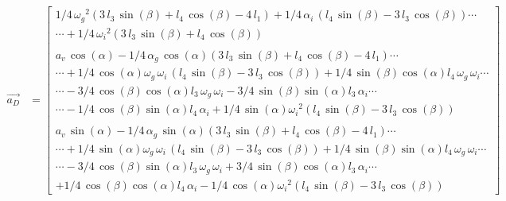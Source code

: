 \begin{equation*}
\begin{split}
\overrightarrow{a_{D}}
&=	\begin{bmatrix}
1/4\,{\omega_{g}}^{2} \left( 3\,l_{3}\,\sin\left( \beta \right) +l_{4}\,\cos \left( \beta \right) -4\,l_{1}\right) +1/4\,\alpha_{i}\, \left( l_{4}\,\sin \left( \beta \right) -3\,l_{3}\,\cos \left( \beta \right)  \right)\cdots\\
\cdots +1/4\,{\omega_{i}}^{2}\left( 3\,l_{3}\,\sin \left( \beta \right) +l_{4}\,\cos \left( \beta\right)  \right) \\
\\
%
a_{v}\,\cos \left( \alpha\right) -1/4\,\alpha_{g}\,\cos \left( \alpha \right)  \left( 3\,l_{3}\,\sin \left( \beta \right) +l_{4}\,\cos \left( \beta \right) -4\,l_{1} \right)\cdots\\
\cdots +1/4\,\cos \left( \alpha \right) \omega_{g}\,\omega_{i}\,\left( l_{4}\,\sin \left( \beta \right) -3\,l_{3}\,\cos \left( \beta\right)  \right) +1/4\,\sin \left( \beta \right) \cos \left( \alpha\right) l_{4}\,\omega_{g}\,\omega_{i}\cdots\\
\cdots-3/4\,\cos \left( \beta \right) \cos \left( \alpha \right) l_{3}\,\omega_{g}\,\omega_{i}-3/4\,\sin\left( \beta \right) \sin \left( \alpha \right) l_{3}\,\alpha_{i}\cdots\\
\cdots-1/4\,\cos \left( \beta \right) \sin \left( \alpha \right) l_{4}\,\alpha_{i}+1/4\,\sin \left( \alpha \right) {\omega_{i}}^{2} \left( l_{4}\,\sin\left( \beta \right) -3\,l_{3}\,\cos \left( \beta \right)  \right) \\
\\
%
a_{v}\,\sin \left( \alpha \right) -1/4\,\alpha_{g}\,\sin \left( \alpha \right)  \left( 3\,l_{3}\,\sin \left( \beta \right) +l_{4}\,\cos \left( \beta \right) -4\,l_{1} \right)\cdots\\
\cdots +1/4\,\sin \left( \alpha \right) \omega_{g}\,\omega_{i}\, \left( l_{4}\,\sin \left( \beta \right) -3\,l_{3}\,\cos \left( \beta \right) \right) +1/4\,\sin \left( \beta \right) \sin \left( \alpha \right) l_{4}\,\omega_{g}\,\omega_{i}\cdots\\
\cdots-3/4\,\cos \left( \beta \right) \sin\left( \alpha \right) l_{3}\,\omega_{g}\,\omega_{i}+3/4\,\sin \left( \beta \right) \cos \left( \alpha \right) l_{3}\,\alpha_{i}\cdots\\
+1/4\,\cos\left( \beta \right) \cos \left( \alpha \right) l_{4}\,\alpha_{i}-1/4\,\cos \left( \alpha \right) {\omega_{i}}^{2} \left( l_{4}\,\sin\left( \beta \right) -3\,l_{3}\,\cos \left( \beta \right)  \right) \
\end{bmatrix}
\end{split}
\end{equation*}